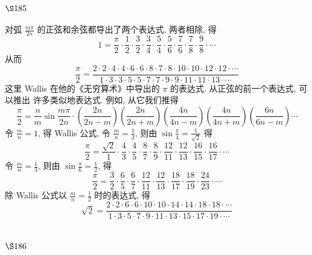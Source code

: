 \section{$\S 185$}

对弧 $\frac{m \pi}{2 n}$ 的正弦和余弦都导出了两个表达式, 两者相除, 得
\[
1=\frac{\pi}{2} \cdot \frac{1}{2} \cdot \frac{3}{2} \cdot \frac{3}{4} \cdot \frac{5}{4} \cdot \frac{5}{6} \cdot \frac{7}{6} \cdot \frac{7}{8} \cdot \frac{9}{8} \cdot \cdots
\]
从而
\[
\frac{\pi}{2}=\frac{2 \cdot 2 \cdot 4 \cdot 4 \cdot 6 \cdot 6 \cdot 8 \cdot 7 \cdot 8 \cdot 10 \cdot 10 \cdot 12 \cdot 12 \cdot \cdots}{1 \cdot 3 \cdot 3 \cdot 5 \cdot 5 \cdot 7 \cdot 7 \cdot 9 \cdot 9 \cdot 11 \cdot 11 \cdot 13 \cdot \cdots}
\]
这里 Wallis 在他的《无穷算术》中导出的 $\pi$ 的表达式. 从正弦的前一个表达式, 可以推出 许多类似地表达式. 例如, 从它我们推得
\[
\frac{\pi}{2}=\frac{n}{m} \sin \frac{m \pi}{2 n} \cdot\left(\frac{2 n}{2 n-m}\right)\left(\frac{2 n}{2 n+m}\right)\left(\frac{4 n}{4 n-m}\right)\left(\frac{4 n}{4 n+m}\right)\left(\frac{6 n}{6 n-m}\right) \cdots
\]
令 $\frac{m}{n}=1$, 得 Wallis 公式, 令 $\frac{m}{n}=\frac{1}{2}$, 则由 $\sin \frac{\pi}{4}=\frac{1}{\sqrt{2}}$ 得
\[
\frac{\pi}{2}=\frac{\sqrt{2}}{1} \cdot \frac{4}{3} \cdot \frac{4}{5} \cdot \frac{8}{7} \cdot \frac{8}{9} \cdot \frac{12}{11} \cdot \frac{12}{13} \cdot \frac{16}{15} \cdot \frac{16}{17} \cdot \cdots
\]
令 $\frac{m}{n}=\frac{1}{3}$, 则由 $\sin \frac{\pi}{6}=\frac{1}{2}$, 得
\[
\frac{\pi}{2}=\frac{3}{2} \cdot \frac{6}{5} \cdot \frac{6}{7} \cdot \frac{12}{11} \cdot \frac{12}{13} \cdot \frac{18}{17} \cdot \frac{18}{19} \cdot \frac{24}{23} \cdot \cdots
\]
除 Wallis 公式以 $\frac{m}{n}=\frac{1}{2}$ 时的表达式, 得
\[
\sqrt{2}=\frac{2 \cdot 2 \cdot 6 \cdot 6 \cdot 10 \cdot 10 \cdot 14 \cdot 14 \cdot 18 \cdot 18 \cdot \cdots}{1 \cdot 3 \cdot 5 \cdot 7 \cdot 9 \cdot 11 \cdot 13 \cdot 15 \cdot 17 \cdot 19 \cdot \cdots}
\]
\section{$\S 186$}

